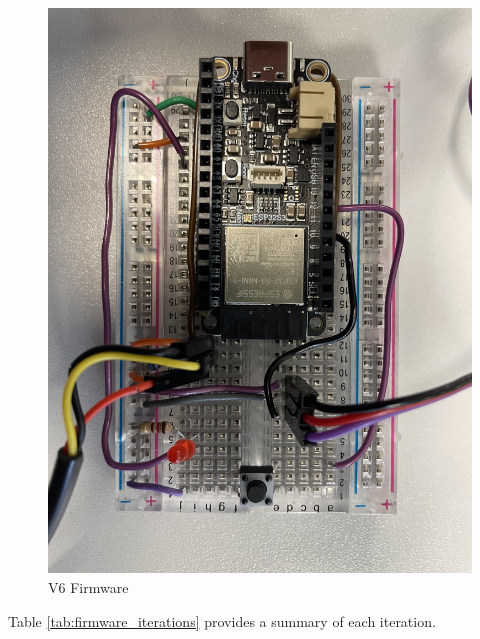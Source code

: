\begin{figure}[h!]
    \centering
    \includegraphics[width=1\linewidth]{images/v6-hardware.jpg}
    \caption{V6 Firmware}
    \label{fig:v6-firmware}
\end{figure}

\noindent Table \ref{tab:firmware_iterations} provides a summary of each iteration. \\

